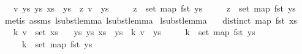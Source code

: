 \begin{isabellebody}
\ \ \ {\isachardoublequoteopen}{\isasymexists}v\ ys{}\ ys{}{\isachardot}{\kern0pt}\ {\isacharparenleft}{\kern0pt}xs\ {\isacharequal}{\kern0pt}\ ys{}\ {\isacharat}{\kern0pt}\ {\isacharbrackleft}{\kern0pt}{\isacharparenleft}{\kern0pt}z{\isacharcomma}{\kern0pt}\ v{\isacharparenright}{\kern0pt}{\isacharbrackright}{\kern0pt}\ {\isacharat}{\kern0pt}\ ys{}\isanewline
\ \ \ \ {\isasymand}\ z\ {\isasymnotin}\ set\ {\isacharparenleft}{\kern0pt}map\ fst\ ys{}{\isacharparenright}{\kern0pt}\isanewline
\ \ \ \ {\isasymand}\ z\ {\isasymnotin}\ set\ {\isacharparenleft}{\kern0pt}map\ fst\ ys{}{\isacharparenright}{\kern0pt}{\isacharparenright}{\kern0pt}{\isachardoublequoteclose}\isanewline
%
\isadelimproof
\ \ %
\endisadelimproof
%
\isatagproof
{}\isamarkupfalse%
\ {\isacharparenleft}{\kern0pt}metis\ assms{\isacharparenleft}{\kern0pt}{}{\isacharcomma}{\kern0pt}{}{\isacharparenright}{\kern0pt}\ lsubst{\isacharunderscore}{\kern0pt}lemma{}{\isacharparenleft}{\kern0pt}{}{\isacharcomma}{\kern0pt}{}{\isacharparenright}{\kern0pt}\ lsubst{\isacharunderscore}{\kern0pt}lemma{}{\isacharparenright}{\kern0pt}%
\endisatagproof
{\isafoldproof}%
%
\isadelimproof
\isanewline
%
\endisadelimproof
\isanewline
\isanewline
{}\isamarkupfalse%
\ lsubst{\isacharunderscore}{\kern0pt}lemma{}{\isacharcolon}{\kern0pt}\isanewline
\ \ \ {\isachardoublequoteopen}distinct\ {\isacharparenleft}{\kern0pt}map\ fst\ xs{\isacharparenright}{\kern0pt}{\isachardoublequoteclose}\isanewline
\ \ \ {\isachardoublequoteopen}{\isacharparenleft}{\kern0pt}k{\isacharcomma}{\kern0pt}\ v{\isacharparenright}{\kern0pt}\ {\isasymin}\ set\ xs{\isachardoublequoteclose}\isanewline
\ \ \ {\isachardoublequoteopen}{\isasymexists}ys{}\ ys{}{\isachardot}{\kern0pt}\ {\isacharparenleft}{\kern0pt}xs\ {\isacharequal}{\kern0pt}\ ys{}\ {\isacharat}{\kern0pt}\ {\isacharbrackleft}{\kern0pt}{\isacharparenleft}{\kern0pt}k{\isacharcomma}{\kern0pt}\ v{\isacharparenright}{\kern0pt}{\isacharbrackright}{\kern0pt}\ {\isacharat}{\kern0pt}\ ys{}\isanewline
\ \ \ \ {\isasymand}\ k\ {\isasymnotin}\ set\ {\isacharparenleft}{\kern0pt}map\ fst\ ys{}{\isacharparenright}{\kern0pt}\isanewline
\ \ \ \ {\isasymand}\ k\ {\isasymnotin}\ set\ {\isacharparenleft}{\kern0pt}map\ fst\ ys{}{\isacharparenright}{\kern0pt}{\isacharparenright}{\kern0pt}{\isachardoublequoteclose}\isanewline

\end{isabellebody}
